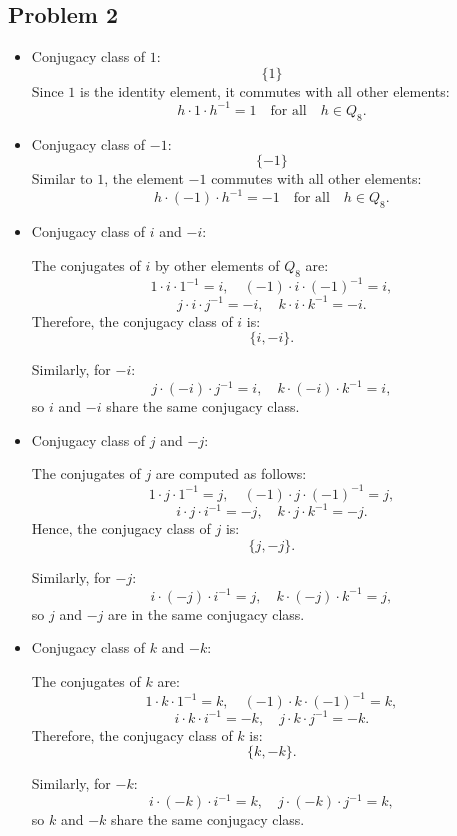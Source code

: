 \documentclass[12pt, letterpaper]{article}
\theoremstyle{definition}
\begin{document}
\newpage
\subsection*{Problem 2}
\begin{itemize}

    \item Conjugacy class of \( 1 \):
    \[
    \{ 1 \}
    \]
    Since \( 1 \) is the identity element, it commutes with all other elements:
    \[
    h \cdot 1 \cdot h^{-1} = 1 \quad \text{for all} \quad h \in Q_8.
    \]

    \item Conjugacy class of \( -1 \):
    \[
    \{ -1 \}
    \]
    Similar to \( 1 \), the element \( -1 \) commutes with all other elements:
    \[
    h \cdot (-1) \cdot h^{-1} = -1 \quad \text{for all} \quad h \in Q_8.
    \]

    \item Conjugacy class of \( i \) and \( -i \):
    
    The conjugates of \( i \) by other elements of \( Q_8 \) are:
    \[
    1 \cdot i \cdot 1^{-1} = i, \quad (-1) \cdot i \cdot (-1)^{-1} = i,
    \]
    \[
    j \cdot i \cdot j^{-1} = -i, \quad k \cdot i \cdot k^{-1} = -i.
    \]
    Therefore, the conjugacy class of \( i \) is:
    \[
    \{ i, -i \}.
    \]
    
    Similarly, for \( -i \):
    \[
    j \cdot (-i) \cdot j^{-1} = i, \quad k \cdot (-i) \cdot k^{-1} = i,
    \]
    so \( i \) and \( -i \) share the same conjugacy class.

    \item Conjugacy class of \( j \) and \( -j \):
    
    The conjugates of \( j \) are computed as follows:
    \[
    1 \cdot j \cdot 1^{-1} = j, \quad (-1) \cdot j \cdot (-1)^{-1} = j,
    \]
    \[
    i \cdot j \cdot i^{-1} = -j, \quad k \cdot j \cdot k^{-1} = -j.
    \]
    Hence, the conjugacy class of \( j \) is:
    \[
    \{ j, -j \}.
    \]
    
    Similarly, for \( -j \):
    \[
    i \cdot (-j) \cdot i^{-1} = j, \quad k \cdot (-j) \cdot k^{-1} = j,
    \]
    so \( j \) and \( -j \) are in the same conjugacy class.

    \item Conjugacy class of \( k \) and \( -k \):
    
    The conjugates of \( k \) are:
    \[
    1 \cdot k \cdot 1^{-1} = k, \quad (-1) \cdot k \cdot (-1)^{-1} = k,
    \]
    \[
    i \cdot k \cdot i^{-1} = -k, \quad j \cdot k \cdot j^{-1} = -k.
    \]
    Therefore, the conjugacy class of \( k \) is:
    \[
    \{ k, -k \}.
    \]
    
    Similarly, for \( -k \):
    \[
    i \cdot (-k) \cdot i^{-1} = k, \quad j \cdot (-k) \cdot j^{-1} = k,
    \]
    so \( k \) and \( -k \) share the same conjugacy class.

\end{itemize}
\end{document}
